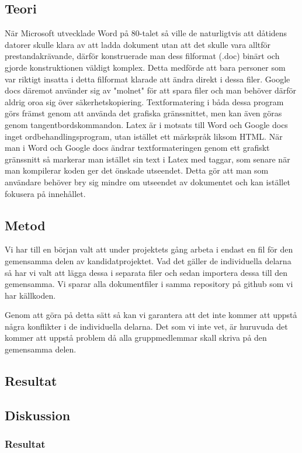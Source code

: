 \subsection{Teori}
När Microsoft utvecklade Word på 80-talet så ville de naturligtvis att dåtidens datorer skulle klara av att ladda 
dokument utan att det skulle vara alltför prestandakrävande, därför konstruerade man dess filformat (.doc) binärt och gjorde konstruktionen 
väldigt komplex. Detta medförde att bara personer som var riktigt insatta i detta filformat klarade att ändra direkt i dessa filer. Google docs däremot använder sig av "molnet" för att spara filer och man behöver därför aldrig oroa sig över säkerhetskopiering. Textformatering i båda dessa program görs främst genom att använda det grafiska gränssnittet, men kan även göras genom tangentbordskommandon.
\newline
Latex är i motsats till Word och Google docs inget ordbehandlingsprogram, utan istället ett märkspråk liksom HTML. När man i Word och Google docs 
ändrar textformateringen genom ett grafiskt gränssnitt så markerar man istället sin text i Latex med taggar, som senare när man kompilerar koden ger
det önskade utseendet. Detta gör att man som användare behöver bry sig mindre om utseendet av dokumentet och kan istället fokusera på innehållet.


\subsection{Metod}
Vi har till en början valt att under projektets gång arbeta i endast en fil för den gemensamma delen av kandidatprojektet. Vad det gäller 
de individuella delarna så har vi valt att lägga dessa i separata filer och sedan importera dessa till den gemensamma. Vi 
sparar alla dokumentfiler i samma repository på github som vi har källkoden.

Genom att göra på detta sätt så kan vi garantera att det inte kommer att uppstå några konflikter i de individuella delarna.
Det som vi inte vet, är huruvuda det kommer att uppstå problem då alla gruppmedlemmar skall skriva på den gemensamma delen.

\subsection{Resultat}
\subsection{Diskussion}
\subsubsection{Resultat}
